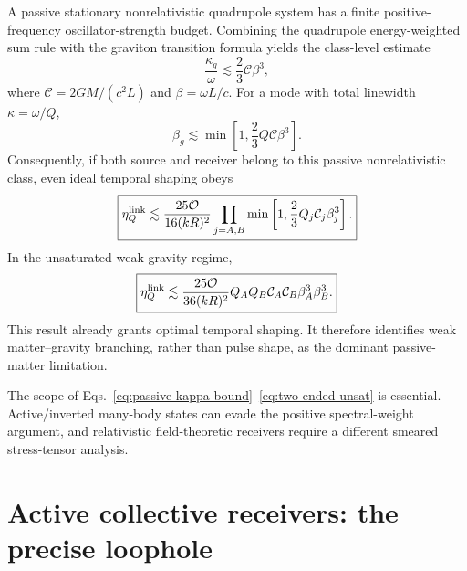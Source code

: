 \documentclass[11pt]{article}
\begin{document}
A passive stationary nonrelativistic quadrupole system has a finite positive-frequency oscillator-strength budget. Combining the quadrupole energy-weighted sum rule with the graviton transition formula yields the class-level estimate
\begin{equation}
\boxed{
\frac{\kappa_g}{\omega}
\lesssim
\frac23\mathcal C\beta^3,
}
\label{eq:passive-kappa-bound}
\end{equation}
where $\mathcal C=2GM/(c^2L)$ and $\beta=\omega L/c$. For a mode with total linewidth $\kappa=\omega/Q$,
\begin{equation}
\boxed{
\beta_g
\lesssim
\min\left[1,\frac23Q\mathcal C\beta^3\right].
}
\label{eq:passive-beta-bound}
\end{equation}
Consequently, if both source and receiver belong to this passive nonrelativistic class, even ideal temporal shaping obeys
\begin{equation}
\boxed{
\eta_Q^{\rm link}
\lesssim
\frac{25\mathcal O}{16(kR)^2}
\prod_{j=A,B}
\min\left[
1,\frac23Q_j\mathcal C_j\beta_j^3
\right].
}
\label{eq:two-ended-bound}
\end{equation}
In the unsaturated weak-gravity regime,
\begin{equation}
\boxed{
\eta_Q^{\rm link}
\lesssim
\frac{25\mathcal O}{36(kR)^2}
Q_AQ_B\mathcal C_A\mathcal C_B\beta_A^3\beta_B^3.
}
\label{eq:two-ended-unsat}
\end{equation}
This result already grants optimal temporal shaping. It therefore identifies weak matter--gravity branching, rather than pulse shape, as the dominant passive-matter limitation.

The scope of Eqs.~\eqref{eq:passive-kappa-bound}--\eqref{eq:two-ended-unsat} is essential. Active/inverted many-body states can evade the positive spectral-weight argument, and relativistic field-theoretic receivers require a different smeared stress-tensor analysis.

\section{Active collective receivers: the precise loophole}
\label{sec:collective}
\end{document}

